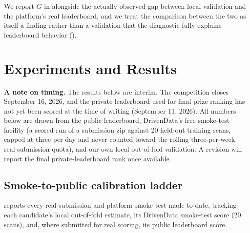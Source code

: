 \documentclass[11pt]{article}
\newcommand{\shiftgap}{\ensuremath{G}}
\begin{document}
We report \shiftgap{} in  alongside the actually observed gap between local validation and the platform's real leaderboard, and we treat the comparison between the two as itself a finding rather than a validation that the diagnostic fully explains leaderboard behavior ().

\section{Experiments and Results}
\label{sec:results}

\textbf{A note on timing.} The results below are interim. The competition closes September 16, 2026, and the private leaderboard used for final prize ranking has not yet been scored at the time of writing (September 11, 2026). All numbers below are drawn from the public leaderboard, DrivenData's free smoke-test facility (a scored run of a submission zip against 20 held-out training scans, capped at three per day and never counted toward the rolling three-per-week real-submission quota), and our own local out-of-fold validation. A revision will report the final private-leaderboard rank once available.

\subsection{Smoke-to-public calibration ladder}

 reports every real submission and platform smoke test made to date, tracking each candidate's local out-of-fold estimate, its DrivenData smoke-test score (20 scans), and, where submitted for real scoring, its public leaderboard score.
\end{document}
